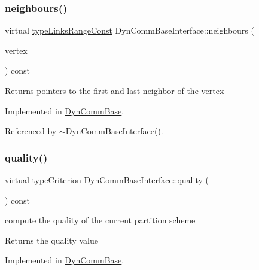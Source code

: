 \subsubsection{\texorpdfstring{neighbours()}{neighbours()}}
{\footnotesize\ttfamily virtual \hyperlink{graphInterface_8h_ae8d27008f15586bbf419af7ad2e0a48a}{type\+Links\+Range\+Const} Dyn\+Comm\+Base\+Interface\+::neighbours (\begin{DoxyParamCaption}\item[{\hyperlink{edge_8h_a5fbd20c46956d479cb10afc9855223f6}{type\+Vertex}}]{vertex }\end{DoxyParamCaption}) const\hspace{0.3cm}{\ttfamily [pure virtual]}}

\begin{DoxyReturn}{Returns}
pointers to the first and last neighbor of the vertex 
\end{DoxyReturn}


Implemented in \hyperlink{classDynCommBase_a3500faab82a0547422b2202b79f49718}{Dyn\+Comm\+Base}.



Referenced by $\sim$\+Dyn\+Comm\+Base\+Interface().

\mbox{\label{classDynCommBaseInterface_a42863260fe57e0982be227255d4f8464}} 
\subsubsection{\texorpdfstring{quality()}{quality()}}
{\footnotesize\ttfamily virtual \hyperlink{criterionInterface_8h_af71ff22f6355fd69a4a62104bfd59a83}{type\+Criterion} Dyn\+Comm\+Base\+Interface\+::quality (\begin{DoxyParamCaption}{ }\end{DoxyParamCaption}) const\hspace{0.3cm}{\ttfamily [pure virtual]}}

compute the quality of the current partition scheme

\begin{DoxyReturn}{Returns}
the quality value 
\end{DoxyReturn}


Implemented in \hyperlink{classDynCommBase_a316b2c63a025810211d205ef6bf1d06c}{Dyn\+Comm\+Base}.



